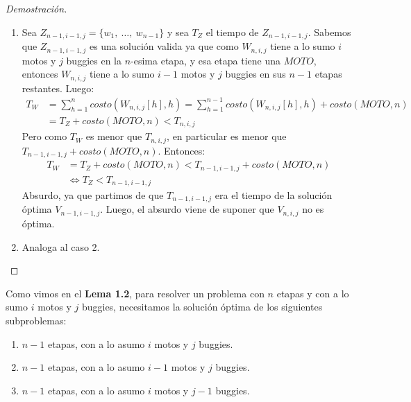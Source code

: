 \begin{proof}[Demostración]
\begin{enumerate}
            \item Sea $Z_{n-1,i-1,j} = \{w_1,\ \dots,\ w_{n-1}\}$ y sea $T_{Z}$ el tiempo de $Z_{n-1,i-1,j}$. Sabemos que $Z_{n-1,i-1,j}$ es una solución valida ya que como $W_{n,i,j}$ tiene a lo sumo $i$ motos y $j$ buggies en la $n$-esima etapa, y esa etapa tiene una $MOTO$, entonces $W_{n,i,j}$ tiene a lo sumo $i-1$ motos y $j$ buggies en sus $n-1$ etapas restantes. Luego:
                \begin{equation*}
                \begin{aligned}
                    T_{W} &= \sum_{h=1}^{n}{costo(W_{n,i,j}[h], h)} = \sum_{h=1}^{n-1}{costo(W_{n,i,j}[h], h)} + costo(MOTO, n) \\
                          &= T_{Z} + costo(MOTO, n) < T_{n,i,j}
                \end{aligned}
                \end{equation*}
                Pero como $T_{W}$ es menor que $T_{n,i,j}$, en particular es menor que $T_{n-1,i-1,j} + costo(MOTO, n)$. Entonces:
                \begin{equation*}
                \begin{aligned}
                    T_{W} &= T_{Z} + costo(MOTO, n) < T_{n-1,i-1,j} + costo(MOTO, n) \\
                          &\iff T_{Z} < T_{n-1,i-1,j}
                \end{aligned}
                \end{equation*}
                Absurdo, ya que partimos de que $T_{n-1,i-1,j}$ era el tiempo de la solución óptima $V_{n-1,i-1,j}$. Luego, el absurdo viene de suponer que $V_{n,i,j}$ no es óptima.
            \item Analoga al caso 2.
   \end{enumerate}
\end{proof}

Como vimos en el \textbf{Lema 1.2}, para resolver un problema con $n$ etapas y con a lo sumo $i$ motos y $j$ buggies, necesitamos la solución óptima de los siguientes subproblemas:
\begin{enumerate}
	\item $n-1$ etapas, con a lo asumo $i$ motos y $j$ buggies.
    \item $n-1$ etapas, con a lo asumo $i-1$ motos y $j$ buggies.
    \item $n-1$ etapas, con a lo asumo $i$ motos y $j-1$ buggies.
\end{enumerate}

